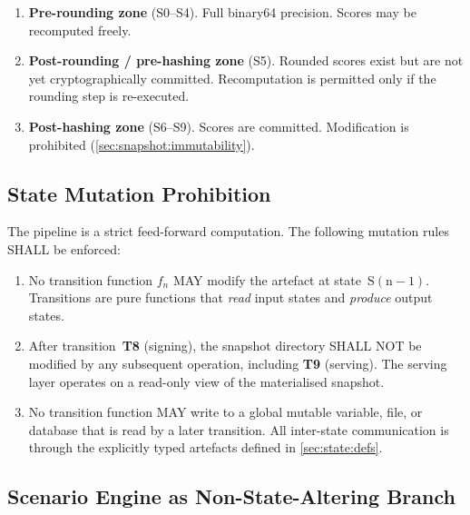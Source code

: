 \begin{enumerate}
  \item \textbf{Pre-rounding zone} (S0--S4).  Full binary64 precision.
    Scores may be recomputed freely.
  \item \textbf{Post-rounding / pre-hashing zone} (S5).  Rounded scores
    exist but are not yet cryptographically committed.  Recomputation is
    permitted only if the rounding step is re-executed.
  \item \textbf{Post-hashing zone} (S6--S9).  Scores are committed.
    Modification is prohibited (\cref{sec:snapshot:immutability}).
\end{enumerate}

\subsection{State Mutation Prohibition}\label{sec:state:mutation}

The pipeline is a strict feed-forward computation.  The following mutation
rules SHALL be enforced:

\begin{enumerate}
  \item No transition function \(f_n\) MAY modify the artefact at
    state~\(\mathrm{S(n{-}1)}\).  Transitions are pure functions that
    \emph{read} input states and \emph{produce} output states.

  \item After transition~\textbf{T8} (signing), the snapshot directory
    SHALL NOT be modified by any subsequent operation, including
    \textbf{T9} (serving).  The serving layer operates on a read-only
    view of the materialised snapshot.

  \item No transition function MAY write to a global mutable variable,
    file, or database that is read by a later transition.  All inter-state
    communication is through the explicitly typed artefacts defined in
    \cref{sec:state:defs}.
\end{enumerate}

\subsection{Scenario Engine as Non-State-Altering Branch}%
\label{sec:state:scenario}

